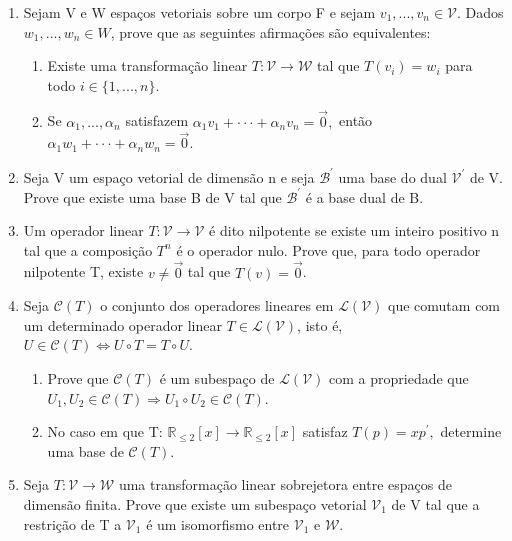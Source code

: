 \documentclass[12pt]{article}
\begin{document}
\begin{enumerate}
    \item Sejam V e W espaços vetoriais sobre um corpo F e sejam $v_{1},...,v_{n}\in\mathcal{V}.$ Dados $w_{1},...,w_{n}\in W$, prove que as seguintes afirmações são equivalentes:
    \begin{enumerate}
        \item[(i)] Existe uma transformação linear $T:\mathcal{V}\rightarrow\mathcal{W}$ tal que $T(v_{i})=w_{i}$ para todo $i \in \{1,..., n\}$.
        \item[(ii)] Se $\alpha_{1},...,\alpha_{n}$ satisfazem $\alpha_{1}v_{1}+\cdot\cdot\cdot+\alpha_{n}v_{n}=\vec{0},$ então $\alpha_{1}w_{1}+\cdot\cdot\cdot+\alpha_{n}w_{n}=\vec{0}.$
    \end{enumerate}
    
    \item Seja V um espaço vetorial de dimensão n e seja $\mathcal{B}^{\prime}$ uma base do dual $\mathcal{V}^{\prime}$ de V. Prove que existe uma base B de V tal que $\mathcal{B}^{\prime}$ é a base dual de B.
    
    \item Um operador linear $T:\mathcal{V}\rightarrow\mathcal{V}$ é dito nilpotente se existe um inteiro positivo n tal que a composição $T^{n}$ é o operador nulo. Prove que, para todo operador nilpotente T, existe $v\ne\vec{0}$ tal que $T(v)=\vec{0}$.
    
    \item Seja $\mathcal{C}(T)$ o conjunto dos operadores lineares em $\mathcal{L}(\mathcal{V})$ que comutam com um determinado operador linear $T\in\mathcal{L}(\mathcal{V})$, isto é, $U\in\mathcal{C}(T)\iff U\circ T=T\circ U.$
    \begin{enumerate}
        \item[(a)] Prove que $\mathcal{C}(T)$ é um subespaço de $\mathcal{L}(\mathcal{V})$ com a propriedade que $U_{1},U_{2}\in\mathcal{C}(T)\Rightarrow U_{1}\circ U_{2}\in\mathcal{C}(T)$.
        \item[(b)] No caso em que T: $\mathbb{R}_{\le2}[x]\rightarrow\mathbb{R}_{\le2}[x]$ satisfaz $T(p)=xp^{\prime},$ determine uma base de $\mathcal{C}(T)$.
    \end{enumerate}
    
    \item Seja $T:\mathcal{V}\rightarrow\mathcal{W}$ uma transformação linear sobrejetora entre espaços de dimensão finita. Prove que existe um subespaço vetorial $\mathcal{V}_{1}$ de V tal que a restrição de T a $\mathcal{V}_{1}$ é um isomorfismo entre $\mathcal{V}_{1}$ e \(\mathcal{W}\).
    

\end{enumerate}
\end{document}
